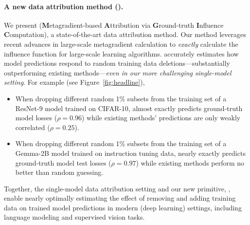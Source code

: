 \paragraph{A new data attribution method (\method{}).}
We present \method{}
(\textbf{M}etagradient-based
  \textbf{A}ttribution via
  \textbf{G}round-truth
  \textbf{I}nfluence
\textbf{C}omputation),
a state-of-the-art
data attribution method.
Our method leverages recent advances in large-scale metagradient calculation
\citep{engstrom2025optimizing} to \textit{exactly} calculate the
influence function \citep{hampel1947influence} for large-scale learning
algorithms.
\method{} accurately estimates how
model predictions respond to random training data deletions---substantially
outperforming existing methods---\textit{even in our more challenging
single-model setting}.
For example (see Figure~\ref{fig:headline}),
\begin{itemize}
  \item When dropping different random 1\% subsets from the training set of a
    ResNet-9 model trained on CIFAR-10, \method{} almost exactly predicts
    ground-truth model losses ($\rho = 0.96$) while existing
    methods' predictions are only weakly correlated ($\rho = 0.25$).
  \item When dropping different random 1\% subsets
    from the training set of a Gemma-2B model trained on instruction tuning
    data, \method{} nearly exactly predicts ground-truth model test losses
    ($\rho = 0.97$) while existing methods perform no better
    than random guessing.
\end{itemize}

\noindent{}Together, the single-model data attribution setting and our new
primitive, \method{}, enable nearly optimally estimating the effect of removing
and adding training data on trained model predictions in modern (deep learning) 
settings, including language modeling and supervised vision tasks.






